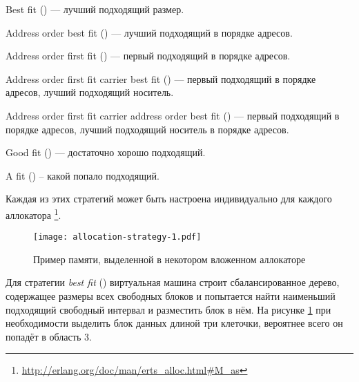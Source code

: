 \documentclass[11pt, oneside]{book}   	%
\newcommand\NamedRef[1]{\ref{#1} <<\nameref{#1}>>}
\begin{document}
\begin{enumerate*}
	\item Best fit () --- лучший подходящий размер.
	\item Address order best fit () --- лучший подходящий в порядке адресов.
	\item Address order first fit () --- первый подходящий в порядке адресов.
	\item Address order first fit carrier best fit () --- первый подходящий в порядке адресов, лучший подходящий носитель.
	\item Address order first fit carrier address order best fit () --- первый подходящий в порядке адресов, лучший подходящий носитель в порядке адресов.
	\item Good fit () --- достаточно хорошо подходящий.
	\item A fit () -- какой попало подходящий.
\end{enumerate*}

Каждая из этих стратегий может быть настроена индивидуально для каждого аллокатора \footnote{\href{http://erlang.org/doc/man/erts\_alloc.html\#M\_as}{http://erlang.org/doc/man/erts\_alloc.html\#M\_as}}.

\begin{figure}
  \texttt{[image: allocation-strategy-1.pdf]}%
  \centering%
	\caption{Пример памяти, выделенной в некотором вложенном аллокаторе}
   \label{fig:allocation-strategy-1}
\end{figure}
\FloatBarrier

Для стратегии \emph{best fit} () виртуальная машина строит сбалансированное дерево, содержащее размеры всех свободных блоков и попытается найти наименьший подходящий свободный интервал и разместить блок в нём. На рисунке \ref{fig:allocation-strategy-1} при необходимости выделить блок данных длиной три клеточки, вероятнее всего он попадёт в область 3.
\end{document}
